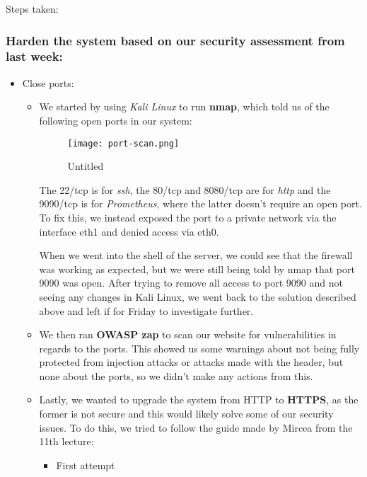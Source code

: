 Steps taken:

\subsubsection{Harden the system based on our security assessment from last week:}
\label{log:harden-the-system-based-on-our-security-assessment-from-last-week}

\begin{itemize}
\item Close ports:

    \begin{itemize}
        \item We started by using \emph{Kali Linux} to run \textbf{nmap}, which told us of the following open ports in our system:
        \begin{figure}
        \centering
        \texttt{[image: port-scan.png]}
        \caption{Untitled}
        \end{figure}
        The 22/tcp is for \emph{ssh}, the 80/tcp and 8080/tcp are for \emph{http} and the 9090/tcp is for \emph{Prometheus}, where the latter doesn't require an open port. To fix this, we instead exposed the port to a private network via the interface eth1 and denied access via eth0.

        When we went into the shell of the server, we could see that the firewall was working as expected, but we were still being told by nmap that port 9090 was open. After trying to remove all access to port 9090 and not seeing any changes in Kali Linux, we went back to the solution described above and left if for Friday to investigate further.

        \item We then ran \textbf{OWASP zap} to scan our website for vulnerabilities in regards to the ports. This showed us some warnings about not being fully protected from injection attacks or attacks made with the header, but none about the ports, so we didn't make any actions from this.
        \item Lastly, we wanted to upgrade the system from HTTP to \textbf{HTTPS}, as the former is not secure and this would likely solve some of our security issues. To do this, we tried to follow the guide made by Mircea from the 11th lecture:

        \begin{itemize}
            \item First attempt


\end{itemize}
\end{itemize}
\end{itemize}
